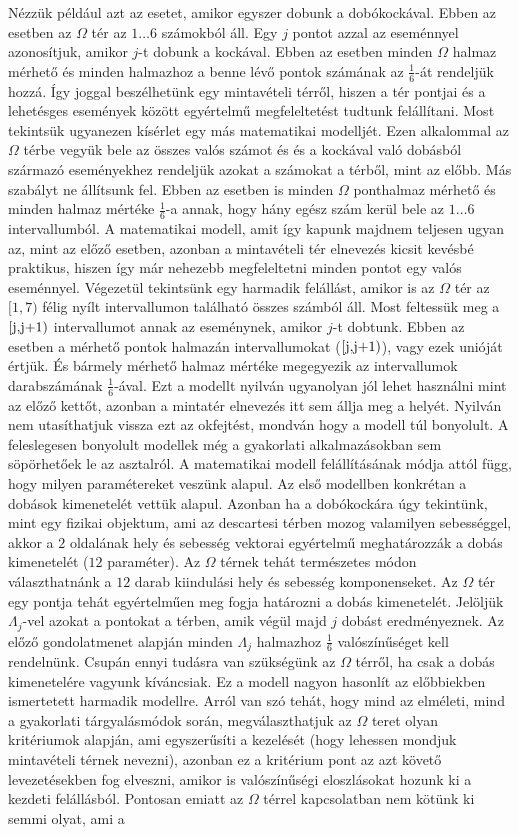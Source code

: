\documentclass{article}
\begin{document}
Nézzük például azt az esetet, amikor egyszer dobunk a dobókockával. Ebben az esetben az $\Omega$ tér az $1 \ldots 6$ számokból áll. Egy $j$ pontot azzal az eseménnyel azonosítjuk, amikor $j$-t dobunk a kockával. Ebben az esetben minden $\Omega$ halmaz mérhető és minden halmazhoz a benne lévő pontok számának az $\frac{1}{6}$-át rendeljük hozzá. Így joggal beszélhetünk egy mintavételi térről, hiszen a tér pontjai és a lehetésges események között egyértelmű megfeleltetést tudtunk felállítani. Most tekintsük ugyanezen kísérlet egy más matematikai modelljét. Ezen alkalommal az $\Omega$ térbe vegyük bele az összes valós számot és és a kockával való dobásból származó eseményekhez rendeljük azokat a számokat a térből, mint az előbb. Más szabályt ne állítsunk fel. Ebben az esetben is minden $\Omega$ ponthalmaz mérhető és minden halmaz mértéke $\frac{1}{6}$-a annak, hogy hány egész szám kerül bele az $1 \ldots 6$ intervallumból. A matematikai modell, amit így kapunk majdnem teljesen ugyan az, mint az előző esetben, azonban a mintavételi tér elnevezés kicsit kevésbé praktikus, hiszen így már nehezebb megfeleltetni minden pontot egy valós eseménnyel. Végezetül tekintsünk egy harmadik felállást, amikor is az $\Omega$ tér az \([1,7)\) félig nyílt intervallumon található összes számból áll. Most feltessük meg a \([$j$,$j+1$)\) intervallumot annak az eseménynek, amikor $j$-t dobtunk. Ebben az esetben a mérhető pontok halmazán intervallumokat (\([$j$,$j+1$)\)), vagy ezek unióját értjük. És bármely mérhető halmaz mértéke megegyezik az intervallumok darabszámának $\frac{1}{6}$-ával. Ezt a modellt nyilván ugyanolyan jól lehet használni mint az előző kettőt, azonban a mintatér elnevezés itt sem állja meg a helyét. Nyilván nem utasíthatjuk vissza ezt az okfejtést, mondván hogy a modell túl bonyolult. A feleslegesen bonyolult modellek még a gyakorlati alkalmazásokban sem söpörhetőek le az asztalról. A matematikai modell felállításának módja attól függ, hogy milyen paramétereket veszünk alapul. Az első modellben konkrétan a dobások kimenetelét vettük alapul. Azonban ha a dobókockára úgy tekintünk, mint egy fizikai objektum, ami az descartesi térben mozog valamilyen sebességgel, akkor a $2$ oldalának hely és sebesség vektorai egyértelmű meghatározzák a dobás kimenetelét ($12$ paraméter). Az $\Omega$ térnek tehát természetes módon választhatnánk a $12$ darab kiindulási hely és sebesség komponenseket. Az $\Omega$ tér egy pontja tehát egyértelműen meg fogja határozni a dobás kimenetelét. Jelöljük $\Lambda_j$-vel azokat a pontokat a térben, amik végül majd $j$ dobást eredményeznek. Az előző gondolatmenet alapján minden $\Lambda_j$ halmazhoz $\frac{1}{6}$ valószínűséget kell rendelnünk. Csupán ennyi tudásra van szükségünk az $\Omega$ térről, ha csak a dobás kimenetelére vagyunk kíváncsiak. Ez a modell nagyon hasonlít az előbbiekben ismertetett harmadik modellre. Arról van szó tehát, hogy mind az elméleti, mind a gyakorlati tárgyalásmódok során, megválaszthatjuk az $\Omega$ teret olyan kritériumok alapján, ami egyszerűsíti a kezelését (hogy lehessen mondjuk mintavételi térnek nevezni), azonban ez a kritérium pont az azt követő levezetésekben fog elveszni, amikor is valószínűségi eloszlásokat hozunk ki a kezdeti felállásból. Pontosan emiatt az $\Omega$ térrel kapcsolatban nem kötünk ki semmi olyat, ami a 
\end{document}
